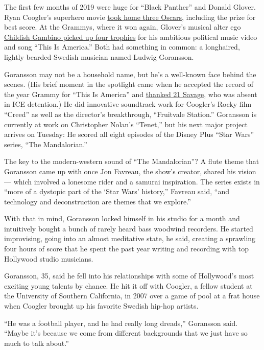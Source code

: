 The first few months of 2019 were huge for ``Black Panther'' and Donald
Glover. Ryan Coogler's superhero movie
\href{https://www.nytimes3xbfgragh.onion/2019/02/24/movies/oscars-academy-awards.html}{took
home three Oscars}, including the prize for best score. At the Grammys,
where it won again, Glover's musical alter ego
\href{https://www.nytimes3xbfgragh.onion/2019/02/10/arts/music/grammy-awards.html}{Childish
Gambino picked up four trophies} for his ambitious political music video
and song ``This Is America.'' Both had something in common: a
longhaired, lightly bearded Swedish musician named Ludwig Goransson.

Goransson may not be a household name, but he's a well-known face behind
the scenes. (His brief moment in the spotlight came when he accepted the
record of the year Grammy for ``This Is America'' and
\href{https://www.youtube.com/watch?v=W9yvwLOAThw}{thanked 21 Savage},
who was absent in ICE detention.) He did innovative soundtrack work for
Coogler's Rocky film ``Creed'' as well as the director's breakthrough,
``Fruitvale Station.'' Goransson is currently at work on Christopher
Nolan's ``Tenet,'' but his next major project arrives on Tuesday: He
scored all eight episodes of the Disney Plus ``Star Wars'' series, ``The
Mandalorian.''

The key to the modern-western sound of ``The Mandalorian''? A flute
theme that Goransson came up with once Jon Favreau, the show's creator,
shared his vision --- which involved a lonesome rider and a samurai
inspiration. The series exists in ``more of a dystopic part of the `Star
Wars' history,'' Favreau said, ``and technology and deconstruction are
themes that we explore.''

With that in mind, Goransson locked himself in his studio for a month
and intuitively bought a bunch of rarely heard bass woodwind recorders.
He started improvising, going into an almost meditative state, he said,
creating a sprawling four hours of score that he spent the past year
writing and recording with top Hollywood studio musicians.

Goransson, 35, said he fell into his relationships with some of
Hollywood's most exciting young talents by chance. He hit it off with
Coogler, a fellow student at the University of Southern California, in
2007 over a game of pool at a frat house when Coogler brought up his
favorite Swedish hip-hop artists.

``He was a football player, and he had really long dreads,'' Goransson
said. ``Maybe it's because we come from different backgrounds that we
just have so much to talk about.''

